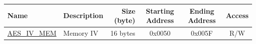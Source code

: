 \begin{longtable}{ |p{3cm} | p{3cm} | r | c | c | c |  }
\hline
\rowcolor{lightgray}
\textbf{Name} & \textbf{Description}  &  \textbf{Size (byte)}  &  \textbf{Starting Address}  &  \textbf{Ending Address}  & \textbf{Access}   \\ \hline
{\hyperref[memdesc:AESIVMEM]{AES\_IV\_MEM}} & Memory IV & 16 bytes  & 0x0050 & 0x005F & R/W \\ \hline
\end{longtable}
